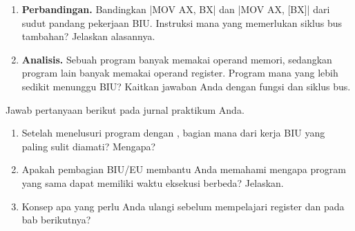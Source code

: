 \begin{enumerate}
    \item \textbf{Perbandingan.} Bandingkan \lstasm|MOV AX, BX| dan
          \lstasm|MOV AX, [BX]| dari sudut pandang pekerjaan BIU.
          Instruksi mana yang memerlukan siklus bus tambahan?
          Jelaskan alasannya.

    \item \textbf{Analisis.} Sebuah program banyak memakai operand
          memori, sedangkan program lain banyak memakai operand
          register. Program mana yang lebih sedikit menunggu BIU?
          Kaitkan jawaban Anda dengan fungsi  dan siklus
          bus.
\end{enumerate}

\begin{refleksibox}
\vspace{1.1em}
Jawab pertanyaan berikut pada jurnal praktikum Anda.
\begin{enumerate}
    \item Setelah menelusuri program dengan ,
          bagian mana dari kerja BIU yang paling sulit diamati?
          Mengapa?
    \item Apakah pembagian BIU/EU membantu Anda memahami mengapa
          program yang sama dapat memiliki waktu eksekusi berbeda?
          Jelaskan.
    \item Konsep apa yang perlu Anda ulangi sebelum mempelajari
          register dan  pada bab berikutnya?
\end{enumerate}
\end{refleksibox}
